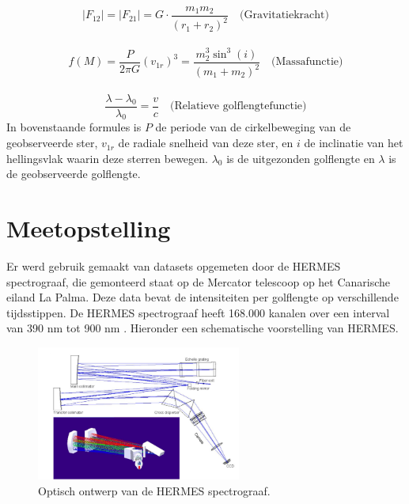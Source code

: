 \documentclass[12pt]{article}
\begin{document}
	\begin{equation}
	   	|F_{12}| = |F_{21}| = G \cdot \frac{m_1 m_2}{{(r_1 + r_2)}^2} \quad \text{(Gravitatiekracht)}
	\end{equation}
	\\
	\begin{equation}\label{massafunctie}
		 f(M)= \frac{P}{2\pi G}({v_{1r}})^3 = \frac{m_2^3 \sin^3(i)}{(m_1 + m_2)^2} \quad \text{(Massafunctie)}
	\end{equation}
	\\
	\begin{equation}\label{lambda}
		\frac{\lambda - \lambda_0}{\lambda_0} = \frac{v}{c} \quad \text{(Relatieve golflengtefunctie)}
	\end{equation}
	In bovenstaande formules is $P$ de periode van de cirkelbeweging van de geobserveerde ster, $v_{1r}$ de radiale snelheid van deze ster, en $i$ de inclinatie van het hellingsvlak waarin deze sterren bewegen.
	$\lambda_0$ is de uitgezonden golflengte en $\lambda$ is de geobserveerde golflengte.
	\newpage
	\section{Meetopstelling}
Er werd gebruik gemaakt van datasets opgemeten door de HERMES spectrograaf, die gemonteerd staat op de Mercator telescoop op het Canarische eiland La Palma. Deze data bevat de intensiteiten per golflengte op verschillende tijdsstippen. De HERMES spectrograaf heeft 168.000 kanalen over een interval van 390 nm tot 900 nm \label{spectrograaf} \cite{Opgave Sterrenkundeproef}. Hieronder een schematische voorstelling van HERMES.
\begin{figure}[h]
   	\centering
    	\includegraphics[width=0.6\textwidth]{plagiaat.png}
    	\caption{Optisch ontwerp van de HERMES spectrograaf.}
    	\label{fig 2:HERMES}
\end{figure}
\end{document}

